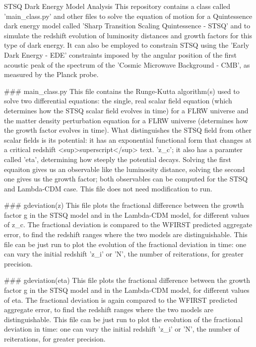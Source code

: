 \Large{STSQ Dark Energy Model Analysis}
This repository contains a class called 'main_class.py' and other files to solve the equation of motion for a Quintessence dark energy model called 'Sharp Transition Scaling Quintessence - STSQ' and to simulate the redshift evolution of luminosity distances and growth factors for this type of dark energy. It can also be employed to constrain STSQ using the 'Early Dark Energy - EDE' constraints imposed by the angular position of the first acoustic peak of the spectrum of the 'Cosmic Microwave Background - CMB', as measured by the Planck probe.

### main_class.py
This file contains the Runge-Kutta algorithm(s) used to solve two differential equations: the single, real scalar field equation (which determines how the STSQ             scalar field evolves in time) for a FLRW universe and the matter density perturbation equation for a FLRW universe (determines how the growth factor evolves in time). What distinguishes the STSQ field from other scalar fields is its potential: it has an exponential functional form that changes at a critical redshift <sup>superscript</sup> text. 'z_c'; it also has a paramter called 'eta', determining how steeply the potential decays. Solving the first equaiton gives us an observable like the luminosity distance, solving the second one gives us the growth factor; both observables can be computed for the STSQ and Lambda-CDM case. This file does not need modification to run.

### gdeviation(z)
This file plots the fractional difference between the growth factor g in the STSQ model and in the Lambda-CDM model, for different values of z_c. The fractional deviation is compared to the WFIRST predicted aggregate error, to find the redshift ranges where the two models are distinguishable. This file can be just run to plot the evolution of the fractional deviation in time: one can vary the initial redshift 'z_i' or 'N', the number of reiterations, for greater precision.

### gdeviation(eta)
This file plots the fractional difference between the growth factor g in the STSQ model and in the Lambda-CDM model, for different values of eta. The fractional deviation is again compared to the WFIRST predicted aggregate error, to find the redshift ranges where the two models are distinguishable. This file can be just run to plot the evolution of the fractional deviation in time: one can vary the initial redshift 'z_i' or 'N', the number of reiterations, for greater precision.


